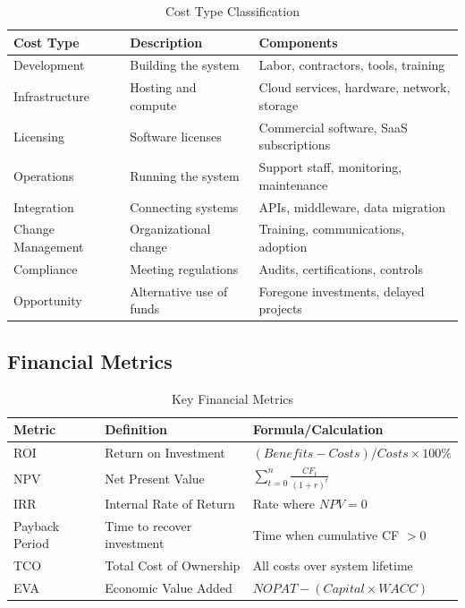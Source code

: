 \documentclass[11pt,letterpaper]{article}
\begin{document}
\begin{table}[H]
\centering
\caption{Cost Type Classification}
\small
\begin{tabular}{@{}L{2.5cm}L{4cm}L{6cm}@{}}
\toprule
\textbf{Cost Type} & \textbf{Description} & \textbf{Components} \\
\midrule
Development & Building the system & Labor, contractors, tools, training \\
\addlinespace
Infrastructure & Hosting and compute & Cloud services, hardware, network, storage \\
\addlinespace
Licensing & Software licenses & Commercial software, SaaS subscriptions \\
\addlinespace
Operations & Running the system & Support staff, monitoring, maintenance \\
\addlinespace
Integration & Connecting systems & APIs, middleware, data migration \\
\addlinespace
Change Management & Organizational change & Training, communications, adoption \\
\addlinespace
Compliance & Meeting regulations & Audits, certifications, controls \\
\addlinespace
Opportunity & Alternative use of funds & Foregone investments, delayed projects \\
\bottomrule
\end{tabular}
\end{table}

\subsection{Financial Metrics}

\begin{table}[H]
\centering
\caption{Key Financial Metrics}
\small
\begin{tabular}{@{}L{2.5cm}L{5cm}L{5cm}@{}}
\toprule
\textbf{Metric} & \textbf{Definition} & \textbf{Formula/Calculation} \\
\midrule
ROI & Return on Investment & $(Benefits - Costs) / Costs \times 100\%$ \\
\addlinespace
NPV & Net Present Value & $\sum_{t=0}^{n} \frac{CF_t}{(1+r)^t}$ \\
\addlinespace
IRR & Internal Rate of Return & Rate where $NPV = 0$ \\
\addlinespace
Payback Period & Time to recover investment & Time when cumulative CF $> 0$ \\
\addlinespace
TCO & Total Cost of Ownership & All costs over system lifetime \\
\addlinespace
EVA & Economic Value Added & $NOPAT - (Capital \times WACC)$ \\
\bottomrule
\end{tabular}
\end{table}
\end{document}

